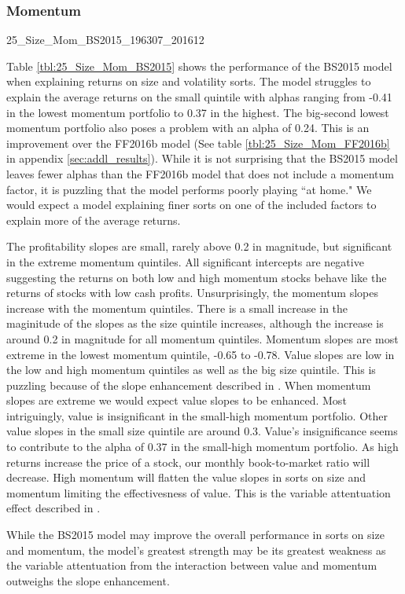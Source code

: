 \subsubsection{Momentum}

{25_Size_Mom_BS2015_196307_201612}

Table \ref{tbl:25_Size_Mom_BS2015} shows the performance of the BS2015 model when
explaining returns on size and volatility sorts. The model struggles to explain the
average returns on the small quintile with alphas ranging from -0.41 in the lowest
momentum portfolio to 0.37 in the highest. The big-second lowest momentum portfolio also
poses a problem with an alpha of 0.24. This is an improvement over the FF2016b model (See
table \ref{tbl:25_Size_Mom_FF2016b} in appendix \ref{sec:addl_results}). While it is not
surprising that the BS2015 model leaves fewer alphas than the FF2016b model that does not
include a momentum factor, it is puzzling that the model performs poorly playing ``at
home." We would expect a model explaining finer sorts on one of the included factors to
explain more of the average returns.

The profitability slopes are small, rarely above 0.2 in magnitude, but significant in the
extreme momentum quintiles. All significant intercepts are negative suggesting the returns
on both low and high momentum stocks behave like the returns of stocks with low cash
profits. Unsurprisingly, the momentum slopes increase with the momentum quintiles. There
is a small increase in the maginitude of the slopes as the size quintile increases,
although the increase is around 0.2 in magnitude for all momentum quintiles. Momentum
slopes are most extreme in the lowest momentum quintile, -0.65 to -0.78. Value slopes are
low in the low and high momentum quintiles as well as the big size quintile. This is
puzzling because of the slope enhancement described in \textcite{fama2015incremental}.
When momentum slopes are extreme we would expect value slopes to be enhanced. Most
intriguingly, value is insignificant in the small-high momentum portfolio. Other value
slopes in the small size quintile are around 0.3. Value's insignificance seems to
contribute to the alpha of 0.37 in the small-high momentum portfolio. As high returns
increase the price of a stock, our monthly book-to-market ratio will decrease. High
momentum will flatten the value slopes in sorts on size and momentum limiting the
effectivesness of value. This is the variable attentuation effect described in
\textcite{fama2015incremental}.

While the BS2015 model may improve the overall performance in sorts on size and momentum,
the model's greatest strength may be its greatest weakness as the variable attentuation
from the interaction between value and momentum outweighs the slope enhancement.


